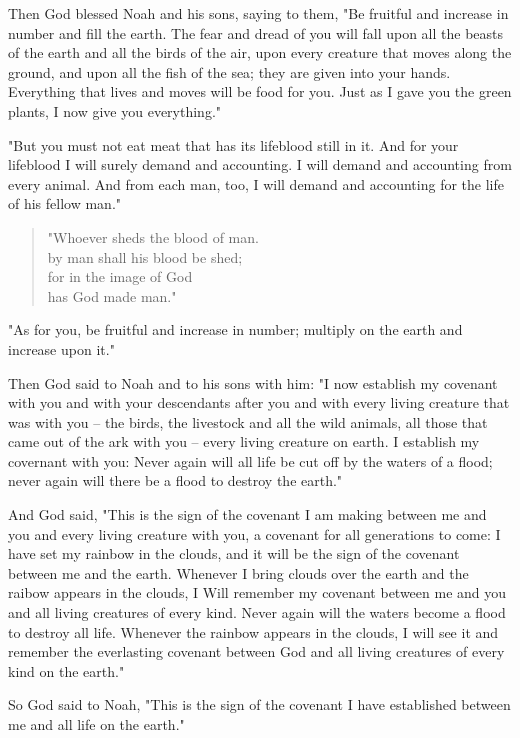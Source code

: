 \C Then God blessed Noah and his sons, saying to them, "Be fruitful and increase
in number and fill the earth. \V The fear and dread of you will fall upon all
the beasts of the earth and all the birds of the air, upon every creature that
moves along the ground, and upon all the fish of the sea; they are given into
your hands. \V Everything that lives and moves will be food for you. Just as I
gave you the green plants, I now give you everything."

\V "But you must not eat meat that has its lifeblood still in it. \V And for
your lifeblood I will surely demand and accounting. I will demand and accounting
from every animal. And from each man, too, I will demand and accounting for the
life of his fellow man."

\begin{quotation}
\V "Whoever sheds the blood of man.\\
by man shall his blood be shed;\\
for in the image of God\\
has God made man."
\end{quotation}

\V "As for you, be fruitful and increase in number; multiply on the earth and
increase upon it."

\V Then God said to Noah and to his sons with him: \V "I now establish my
covenant with you and with your descendants after you \V and with every living
creature that was with you -- the birds, the livestock and all the wild animals,
all those that came out of the ark with you -- every living creature on earth.
\V I establish my covernant with you: Never again will all life be cut off by
the waters of a flood; never again will there be a flood to destroy the earth."

\V And God said, "This is the sign of the covenant I am making between me and
you and every living creature with you, a covenant for all generations to come:
\V I have set my rainbow in the clouds, and it will be the sign of the covenant
between me and the earth. \V Whenever I bring clouds over the earth and the
raibow appears in the clouds, \V I Will remember my covenant between me and you
and all living creatures of every kind. Never again will the waters become a
flood to destroy all life. \V Whenever the rainbow appears in the clouds, I will
see it and remember the everlasting covenant between God and all living
creatures of every kind on the earth."

\V So God said to Noah, "This is the sign of the covenant I have established
between me and all life on the earth."
